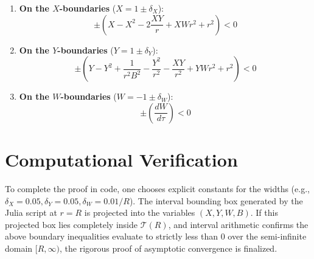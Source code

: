 \documentclass[12pt]{article}
\begin{document}
\begin{enumerate}
    \item \textbf{On the $X$-boundaries} ($X = 1 \pm \delta_X$):
    \[ \pm \left( X - X^2 - 2 \frac{X Y}{r} + X W r^2 + r^2 \right) < 0 \]
    
    \item \textbf{On the $Y$-boundaries} ($Y = 1 \pm \delta_Y$):
    \[ \pm \left( Y - Y^2 + \frac{1}{r^2 B^2} - \frac{Y^2}{r^2} - \frac{X Y}{r^2} + Y W r^2 + r^2 \right) < 0 \]
    
    \item \textbf{On the $W$-boundaries} ($W = -1 \pm \delta_W$):
    \[ \pm \left( \frac{dW}{d\tau} \right) < 0 \]
\end{enumerate}

\section{Computational Verification}
To complete the proof in code, one chooses explicit constants for the widths (e.g., $\delta_X = 0.05, \delta_Y = 0.05, \delta_W = 0.01/R$). 
The interval bounding box generated by the Julia script at $r=R$ is projected into the variables $(X, Y, W, B)$. If this projected box lies completely inside $\mathcal{T}(R)$, and interval arithmetic confirms the above boundary inequalities evaluate to strictly less than $0$ over the semi-infinite domain $[R, \infty)$, the rigorous proof of asymptotic convergence is finalized.
\end{document}
